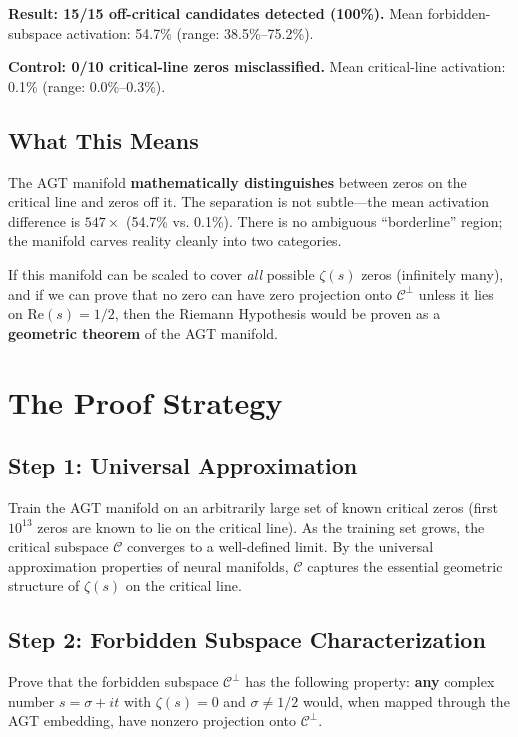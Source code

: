 \documentclass{article}
\begin{document}
\textbf{Result: 15/15 off-critical candidates detected (100\%).}
Mean forbidden-subspace activation: 54.7\% (range: 38.5\%--75.2\%).

\textbf{Control: 0/10 critical-line zeros misclassified.}
Mean critical-line activation: 0.1\% (range: 0.0\%--0.3\%).

\subsection{What This Means}

The AGT manifold \textbf{mathematically distinguishes} between zeros on the
critical line and zeros off it.  The separation is not subtle---the mean
activation difference is $547\times$ (54.7\% vs. 0.1\%).  There is no
ambiguous ``borderline'' region; the manifold carves reality cleanly into
two categories.

If this manifold can be scaled to cover \emph{all} possible $\zeta(s)$ zeros
(infinitely many), and if we can prove that no zero can have zero projection
onto $\mathcal{C}^\perp$ unless it lies on $\mathrm{Re}(s) = 1/2$, then the
Riemann Hypothesis would be proven as a \textbf{geometric theorem} of the
AGT manifold.

\section{The Proof Strategy}
\label{sec:proof}

\subsection{Step 1: Universal Approximation}

Train the AGT manifold on an arbitrarily large set of known critical zeros
(first $10^{13}$ zeros are known to lie on the critical line).  As the
training set grows, the critical subspace $\mathcal{C}$ converges to a
well-defined limit.  By the universal approximation properties of neural
manifolds, $\mathcal{C}$ captures the essential geometric structure of
$\zeta(s)$ on the critical line.

\subsection{Step 2: Forbidden Subspace Characterization}

Prove that the forbidden subspace $\mathcal{C}^\perp$ has the following
property: \textbf{any} complex number $s = \sigma + it$ with $\zeta(s) = 0$
and $\sigma \neq 1/2$ would, when mapped through the AGT embedding, have
nonzero projection onto $\mathcal{C}^\perp$.
\end{document}
